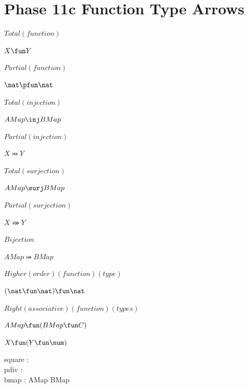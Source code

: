 \documentclass[a4paper,10pt,fleqn]{article}
\begin{document}
\section*{Phase 11c Function Type Arrows}

\noindent 

\bigskip

\noindent
$Total(function)$


\noindent
$X \fun Y$


\noindent 

\bigskip

\noindent
$Partial(function)$


\noindent
$\nat \pfun \nat$


\noindent 

\bigskip

\noindent
$Total(injection)$


\noindent
$AMap \inj BMap$


\noindent 

\bigskip

\noindent
$Partial(injection)$


\noindent
$X \pinj Y$


\noindent 

\bigskip

\noindent
$Total(surjection)$


\noindent
$AMap \surj BMap$


\noindent 

\bigskip

\noindent
$Partial(surjection)$


\noindent
$X \psurj Y$


\noindent 

\bigskip

\noindent
$Bijection$


\noindent
$AMap \bij BMap$


\noindent 

\bigskip

\noindent
$Higher(order)(function)(type)$


\noindent
$(\nat \fun \nat) \fun \nat$


\noindent 

\bigskip

\noindent
$Right(associative)(function)(types)$


\noindent
$AMap \fun (BMap \fun C)$


\noindent
$X \fun (Y \fun \num)$


\begin{zed}
\end{zed}

\begin{axdef}
square : \nat \fun \nat \\
pdiv : \nat \pfun \nat \\
bmap : AMap \bij BMap
\end{axdef}
\end{document}
